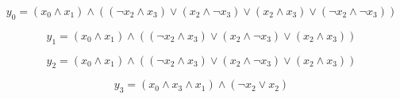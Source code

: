 \documentclass{scrartcl}
\begin{document}
	
\begin{equation}
	y_0 = (x_0 \wedge x_1) \wedge (( \lnot x_2 \wedge x_3) \lor (x_2 \wedge  \lnot x_3) \lor (x_2 \wedge x_3) \lor ( \lnot x_2 \wedge  \lnot x_3))
\end{equation}

\begin{equation}
	y_1 = (x_0 \wedge x_1) \wedge (( \lnot x_2 \wedge x_3) \lor (x_2 \wedge  \lnot x_3) \lor (x_2 \wedge x_3))
\end{equation}

\begin{equation}
	y_2 = (x_0 \wedge x_1) \wedge (( \lnot x_2 \wedge x_3) \lor (x_2 \wedge  \lnot x_3) \lor (x_2 \wedge x_3))
\end{equation}

\begin{equation}
	y_3 = (x_0 \wedge x_3 \wedge x_1) \wedge ( \lnot x_2 \lor x_2)
\end{equation}
\end{document}
